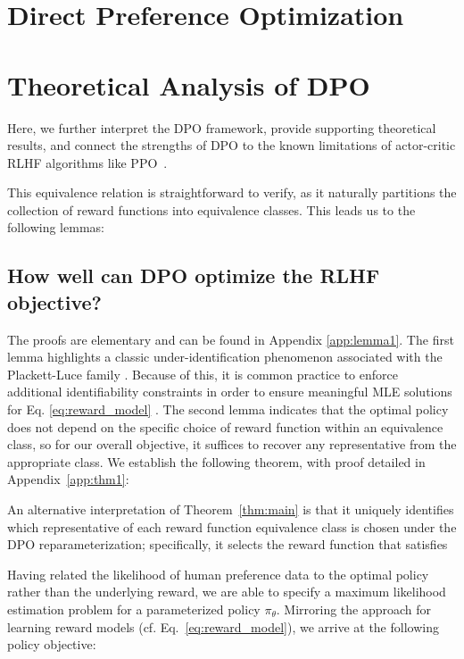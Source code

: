 \section{Direct Preference Optimization}\label{sec:DPO}

\section{Theoretical Analysis of DPO} Here, we further interpret the DPO framework, provide supporting theoretical results, and connect the strengths of DPO to the known limitations of actor-critic RLHF algorithms like PPO~\cite{schulman2017proximal}.

This equivalence relation is straightforward to verify, as it naturally partitions the collection of reward functions into equivalence classes. This leads us to the following lemmas:

\subsection{How well can DPO optimize the RLHF objective?}

The proofs are elementary and can be found in Appendix \ref{app:lemma1}. The first lemma highlights a classic under-identification phenomenon associated with the Plackett-Luce family \cite{plackett1975analysis}. Because of this, it is common practice to enforce additional identifiability constraints in order to ensure meaningful MLE solutions for Eq. \ref{eq:reward_model} \cite{bong2022generalized}. The second lemma indicates that the optimal policy does not depend on the specific choice of reward function within an equivalence class, so for our overall objective, it suffices to recover any representative from the appropriate class. We establish the following theorem, with proof detailed in Appendix~\ref{app:thm1}:

An alternative interpretation of Theorem~\ref{thm:main} is that it uniquely identifies which representative of each reward function equivalence class is chosen under the DPO reparameterization; specifically, it selects the reward function that satisfies

Having related the likelihood of human preference data to the optimal policy rather than the underlying reward, we are able to specify a maximum likelihood estimation problem for a parameterized policy $\pi_\theta$. Mirroring the approach for learning reward models (cf. Eq.~\ref{eq:reward_model}), we arrive at the following policy objective:


